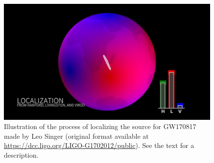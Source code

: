 \begin{figure}
\begin{minipage}{0.45\linewidth}
    \includegraphics[width=\linewidth]{sectionDetection/antenna-patterns_LeoSinger/00900.jpg}
  \end{minipage}
  \hfill
  \caption{Illustration of the process of localizing the source for GW170817 made by Leo Singer (original format available at \url{https://dcc.ligo.org/LIGO-G1702012/public}). See the text for a description.}
  \label{fig:localization}
\end{figure}


